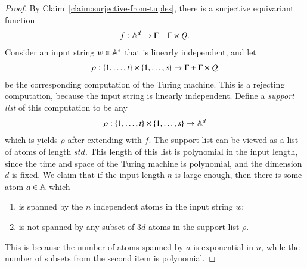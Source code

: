 \begin{proof}
By Claim~\ref{claim:surjective-from-tuples}, there is a  surjective equivariant function
\begin{align*}
f : \mathbb A^d \to \Gamma + \Gamma \times Q.
\end{align*}
	Consider an input string $w \in \mathbb A^*$ that is linearly independent, and let 
	\begin{align*}
		\rho : \{1,\ldots,t\} \times \{1,\ldots,s\} \to \Gamma + \Gamma \times Q
	\end{align*}
	be   the corresponding computation of the Turing machine. This is a rejecting computation, because the input string is linearly independent. Define a \emph{support list} of this computation to be any 
	\begin{align*}
		\bar \rho : \{1,\ldots,t\} \times \{1,\ldots,s\} \to \mathbb A^d
	\end{align*}
	which is yields $\rho$ after extending with $f$. The support list  can be viewed as a list of atoms of length $std$. This length of this list is polynomial in the input length, since the time and space of the Turing machine is polynomial, and the dimension $d$ is fixed. We claim that if the input length $n$ is large enough, then there is some atom $a \in \mathbb A$ which 		\begin{enumerate}
		\item is spanned by the $n$ independent atoms in the input string  $w$;
		\item is not spanned by any subset of $3d$ atoms in the support list  $\bar \rho$.
	\end{enumerate}
	This is because  the number of atoms spanned by $\bar a$ is exponential in $n$, while the number of subsets from the second item is polynomial.  


\end{proof}
